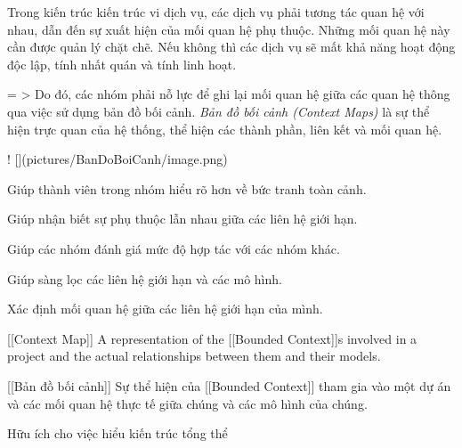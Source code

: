 Trong kiến trúc kiến trúc vi dịch vụ, các dịch vụ phải tương tác quan hệ với nhau, dẫn đến sự xuất hiện của mối quan hệ phụ thuộc. Những mối quan hệ này cần được quản lý chặt chẽ. Nếu không thì các dịch vụ sẽ mất khả năng hoạt động độc lập, tính nhất quán và tính linh hoạt.

= > Do đó, các nhóm phải nỗ lực để ghi lại mối quan hệ giữa các quan hệ thông qua việc sử dụng bản đồ bối cảnh.
\emph{Bản đồ bối cảnh (Context Maps)}     là sự thể hiện trực quan của hệ thống, thể hiện các thành phần, liên kết và mối quan hệ.

! [](pictures/BanDoBoiCanh/image.png)



Giúp thành viên trong nhóm hiểu rõ hơn về bức tranh toàn cảnh.

Giúp nhận biết sự phụ thuộc lẫn nhau giữa các liên hệ giới hạn.

Giúp các nhóm đánh giá mức độ hợp tác với các nhóm khác.

Giúp sàng lọc các liên hệ giới hạn và các mô hình.

Xác định mối quan hệ giữa các liên hệ giới hạn của mình.


[[Context Map]] A representation of the [[Bounded Context]]s involved in a project and the actual relationships between them and their models.

[[Bản đồ bối cảnh]] Sự thể hiện của [[Bounded Context]] tham gia vào một dự án và các mối quan hệ thực tế giữa chúng và các mô hình của chúng.

Hữu ích cho việc hiểu kiến trúc tổng thể







